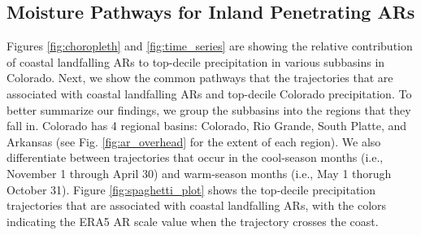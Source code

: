 \documentclass[draft]{agujournal2019}
\begin{document}
\subsection{Moisture Pathways for Inland Penetrating ARs}
\label{sec:results:moisture_pathways}
%

Figures \ref{fig:choropleth} and \ref{fig:time_series} are showing the relative contribution of coastal landfalling ARs to top-decile precipitation in various subbasins in Colorado. Next, we show the common pathways that the trajectories that are associated with coastal landfalling ARs and top-decile Colorado precipitation. To better summarize our findings, we group the subbasins into the regions that they fall in. Colorado has 4 regional basins: Colorado, Rio Grande, South Platte, and Arkansas (see Fig. \ref{fig:ar_overhead} for the extent of each region). We also differentiate between trajectories that occur in the cool-season months (i.e., November 1 through April 30) and warm-season months (i.e., May 1 thorugh October 31). Figure \ref{fig:spaghetti_plot} shows the top-decile precipitation trajectories that are associated with coastal landfalling ARs, with the colors indicating the ERA5 AR scale value when the trajectory crosses the coast. 
\end{document}
